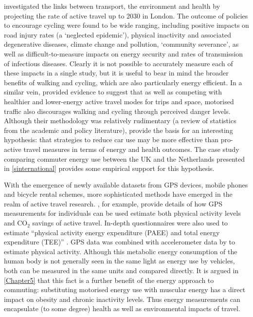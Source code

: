 \citet{Woodcock2007} investigated the links between transport, the environment
and health by projecting the rate of active travel up to 2030 in London.
The outcome of policies to encourage cycling were found to be wide ranging,
including positive impacts on road injury rates (a `neglected epidemic'), physical
inactivity and associated degenerative diseases, climate change and pollution,
`community severance', as well as difficult-to-measure impacts on energy
security and rates of transmission of infectious diseases. Clearly it is not
possible to accurately measure each of these impacts in a single study, but
it is useful to bear in mind the broader benefits of walking and cycling, which
are also particularly energy efficient. In a similar vein, \citet{Jacobsen2009}
provided evidence to suggest that as well as competing with healthier
and lower-energy active travel modes
for trips and space, motorised traffic also discourages walking and cycling
through perceived danger levels. Although their methodology was relatively
rudimentary (a review of statistics from the academic and policy literature),
\citet{Jacobsen2009} provide the basis for an interesting hypothesis:
that strategies to reduce
car use may be more effective than pro-active travel measures in terms of energy
and health outcomes. The case study comparing commuter energy use between
the UK and the Netherlands presented in \cref{sinternational} provides some
empirical support for this hypothesis.

With the emergence of newly available datasets from GPS devices, mobile phones
and bicycle rental schemes, more sophisticated methods have emerged in
the realm of active travel research. \citet{Ogil-cambridge2010}, for example,
provide details of how GPS measurements for individuals can be used
estimate both physical activity levels and CO$_2$ savings of active travel.
In-depth questionnaires were also used to estimate
``physical activity energy expenditure (PAEE) and total energy expenditure (TEE)''
\citep[p.~7]{Ogil-cambridge2010}. GPS data was combined with
accelerometer data by \citet{Cooper2010} to estimate physical activity. Although this
metabolic energy consumption of the human body is not
generally seen in the same light as energy use by vehicles, both can be measured
in the same units and compared directly. It is argued in \cref{Chapter5} that
this fact is a further benefit of the energy approach to commuting: substituting
motorised energy use with muscular energy has a direct impact on obesity and
chronic inactivity levels. Thus energy measurements can
encapsulate (to some degree) health as well as environmental impacts of travel.

